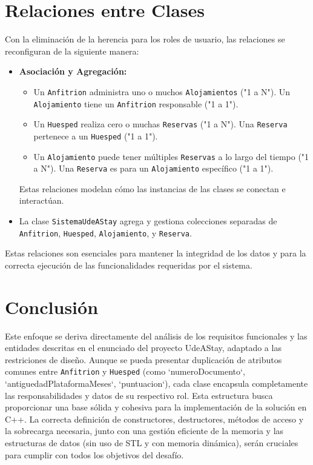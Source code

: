 \documentclass[journal]{IEEEtran}
\begin{document}
\section{Relaciones entre Clases}
Con la eliminación de la herencia para los roles de usuario, las relaciones se reconfiguran de la siguiente manera:
\begin{itemize}
    \item \textbf{Asociación y Agregación:}
        \begin{itemize}
            \item Un \texttt{Anfitrion} administra uno o muchos \texttt{Alojamientos} ("1 a N"). Un \texttt{Alojamiento} tiene un \texttt{Anfitrion} responsable ("1 a 1").
            \item Un \texttt{Huesped} realiza cero o muchas \texttt{Reservas} ("1 a N"). Una \texttt{Reserva} pertenece a un \texttt{Huesped} ("1 a 1").
            \item Un \texttt{Alojamiento} puede tener múltiples \texttt{Reservas} a lo largo del tiempo ("1 a N"). Una \texttt{Reserva} es para un \texttt{Alojamiento} específico ("1 a 1").
        \end{itemize}
        Estas relaciones modelan cómo las instancias de las clases se conectan e interactúan.
    \item La clase \texttt{SistemaUdeAStay} agrega y gestiona colecciones separadas de \texttt{Anfitrion}, \texttt{Huesped}, \texttt{Alojamiento}, y \texttt{Reserva}.
\end{itemize}
Estas relaciones son esenciales para mantener la integridad de los datos y para la correcta ejecución de las funcionalidades requeridas por el sistema.

\section{Conclusión}
 Este enfoque se deriva directamente del análisis de los requisitos funcionales y las entidades descritas en el enunciado del proyecto UdeAStay, adaptado a las restriciones de diseño. Aunque se pueda presentar duplicación de atributos comunes entre \texttt{Anfitrion} y \texttt{Huesped} (como `numeroDocumento`, `antiguedadPlataformaMeses`, `puntuacion`), cada clase encapsula completamente las responsabilidades y datos de su respectivo rol. Esta estructura busca proporcionar una base sólida y cohesiva para la implementación de la solución en C++. La correcta definición de constructores, destructores, métodos de acceso y la sobrecarga necesaria, junto con una gestión eficiente de la memoria y las estructuras de datos (sin uso de STL y con memoria dinámica), serán cruciales para cumplir con todos los objetivos del desafío.
\end{document}
